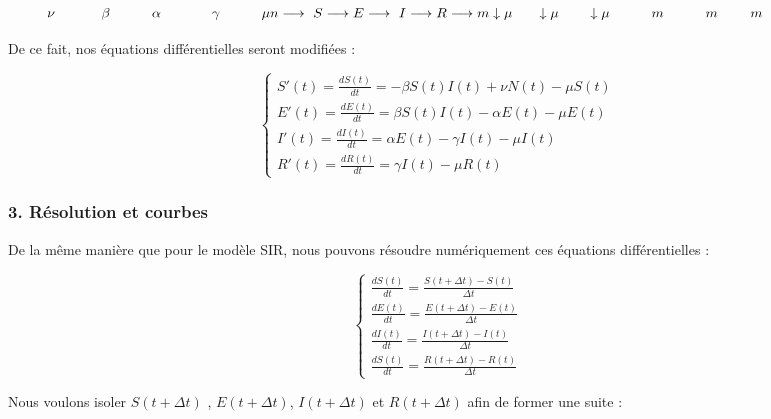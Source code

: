 \documentclass[
]{article}
\begin{document}
\[\nu \ \ \ \ \ \  \  \ \ \ \beta\ \ \ \  \ \  \ \ \ \alpha \ \ \ \ \ \ \ \ \ \  \ \gamma  \ \ \ \ \ \ \  \ \   \mu \\ n \longrightarrow\ S  \longrightarrow E \longrightarrow\ I  \longrightarrow  R \longrightarrow m\\ \downarrow \mu   \ \ \ \  \ \downarrow \mu  \ \ \ \ \  \  \downarrow  \mu\ \ \ \ \ \ \ \  \ \ \\ m \ \ \ \ \ \ \ \  \ m  \ \ \ \ \ \  \  m \ \ \ \ \ \ \ \ \ \ \ \ \ \ \]

De ce fait, nos équations différentielles seront modifiées :

\[\begin{equation}
    \left\{
     \begin{array}{l}
        S'(t) = \frac{dS(t)}{dt} = - \beta S(t)  I(t) + \nu N(t) - \mu S(t)\\
        E'(t) = \frac{dE(t)}{dt} = \beta S(t)  I(t) - \alpha E(t) - \mu E(t)\\
        I'(t) = \frac{dI(t)}{dt} = \alpha E(t) - \gamma  I(t) - \mu I(t)\\
        R'(t) = \frac{dR(t)}{dt} = \gamma I(t) - \mu R(t)
      \end{array}
    \right.
\end{equation}\]

\hypertarget{ruxe9solution-et-courbes}{%
\subsubsection{3. Résolution et
courbes}\label{ruxe9solution-et-courbes}}

De la même manière que pour le modèle SIR, nous pouvons résoudre
numériquement ces équations différentielles :

\[\begin{equation}
    \left\{
     \begin{array}{l}
        \frac{dS(t)}{dt} = \frac{S(t + \Delta t)-S(t)}{\Delta t} \\
        \frac{dE(t)}{dt} = \frac{E(t + \Delta t)-E(t)}{\Delta t} \\
        \frac{dI(t)}{dt} = \frac{I(t + \Delta t) -I(t)}{\Delta t}  \\
        \frac{dS(t)}{dt} = \frac{R(t + \Delta t) -R(t)}{\Delta t} 
      \end{array}
    \right.
\end{equation}\]

Nous voulons isoler \(S(t + \Delta t)\) , \(E(t + \Delta t)\),
\(I(t + \Delta t)\) et \(R(t + \Delta t)\) afin de former une suite :
\end{document}
